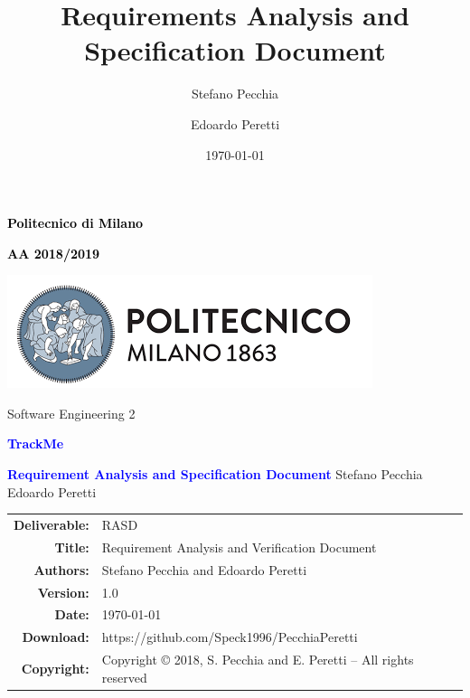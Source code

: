 \documentclass[a4paper,11pt]{report}
\title{Requirements Analysis and Specification Document}
\author{Stefano Pecchia \and Edoardo Peretti}
\date{\today}
\begin{document}
\begin{titlepage}
\centering

\textcolor{black}{\textbf{Politecnico di Milano}} \par
\textcolor{black}{\textbf{AA 2018/2019}} \par  \vspace{2em}
\includegraphics[scale=0.7]{resources/PolimiLogo}\par \vspace{1em}

Software Engineering 2 \par \vspace{1.5cm}
\textcolor{Blue}{\Large\textbf{TrackMe}} \par \vspace{3cm}

{\textcolor{Blue}{\textbf{\Huge{Requirement Analysis and Specification Document}}}} \vfill
Stefano Pecchia \hspace{5em} Edoardo Peretti \vspace{4cm}
\end{titlepage}



\begin{table}[h!]
\centering
\begin{tabular}{rl}
\hline
\textbf{Deliverable:} & RASD\\
\textbf{Title:} & Requirement Analysis and Verification Document \\
\textbf{Authors:} & Stefano Pecchia and Edoardo Peretti\\
\textbf{Version:} & 1.0 \\ 
\textbf{Date:} & \today \\
\textbf{Download:} & https://github.com/Speck1996/PecchiaPeretti \\
\textbf{Copyright:} & Copyright © 2018, S. Pecchia and E. Peretti – All rights reserved \\
\hline
\end{tabular}
\end{table}



\tableofcontents






\end{document}
